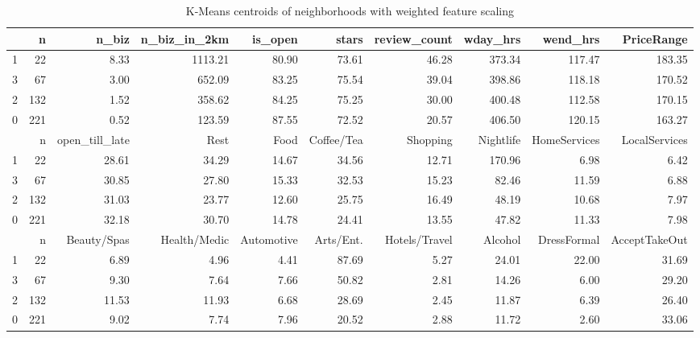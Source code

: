 \documentclass[compsoc]{IEEEtran}
\let\MYoriglatexcaption\caption
\renewcommand{\caption}[2][\relax]{\MYoriglatexcaption[#2]{#2}}
\begin{document}
\begin{table}[htbp]
\caption{K-Means centroids of neighborhoods with weighted feature scaling}
\label{nbh-centroids-weighted}

\begin{tabular}{lrrrrrrrrr}
\toprule
{} &    n &  n\_biz &  n\_biz\_in\_2km &  is\_open &  stars &  review\_count &  wday\_hrs &  wend\_hrs &  PriceRange \\
\midrule
1 &   22 &   8.33 &       1113.21 &    80.90 &  73.61 &         46.28 &    373.34 &    117.47 &      183.35 \\
3 &   67 &   3.00 &        652.09 &    83.25 &  75.54 &         39.04 &    398.86 &    118.18 &      170.52 \\
2 &  132 &   1.52 &        358.62 &    84.25 &  75.25 &         30.00 &    400.48 &    112.58 &      170.15 \\
0 &  221 &   0.52 &        123.59 &    87.55 &  72.52 &         20.57 &    406.50 &    120.15 &      163.27 \\
\midrule
{} &    n &  open\_till\_late &   Rest &   Food &  Coffee/Tea &  Shopping &  Nightlife &  HomeServices &  LocalServices \\
\midrule
1 &   22 &           28.61 &  34.29 &  14.67 &       34.56 &     12.71 &     170.96 &          6.98 &           6.42 \\
3 &   67 &           30.85 &  27.80 &  15.33 &       32.53 &     15.23 &      82.46 &         11.59 &           6.88 \\
2 &  132 &           31.03 &  23.77 &  12.60 &       25.75 &     16.49 &      48.19 &         10.68 &           7.97 \\
0 &  221 &           32.18 &  30.70 &  14.78 &       24.41 &     13.55 &      47.82 &         11.33 &           7.98 \\
\midrule
{} &    n &  Beauty/Spas &  Health/Medic &  Automotive &  Arts/Ent. &  Hotels/Travel &  Alcohol &  DressFormal &  AcceptTakeOut \\
\midrule
1 &   22 &         6.89 &          4.96 &        4.41 &      87.69 &           5.27 &    24.01 &        22.00 &          31.69 \\
3 &   67 &         9.30 &          7.64 &        7.66 &      50.82 &           2.81 &    14.26 &         6.00 &          29.20 \\
2 &  132 &        11.53 &         11.93 &        6.68 &      28.69 &           2.45 &    11.87 &         6.39 &          26.40 \\
0 &  221 &         9.02 &          7.74 &        7.96 &      20.52 &           2.88 &    11.72 &         2.60 &          33.06 \\
\bottomrule
\end{tabular}

\end{table}
\end{document}
